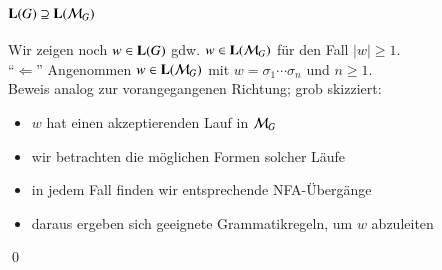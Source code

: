 \documentclass[aspectratio=1610,onlymath]{beamer}
\begin{document}
\begin{frame}[t]\frametitle{$\textbf{\textcolor{black}{L}}(G)\supseteq\textbf{\textcolor{black}{L}}(\mathcal{M}_G)$}

Wir zeigen noch $w\in\textbf{\textcolor{black}{L}}(G)$ gdw. $w\in\textbf{\textcolor{black}{L}}(\mathcal{M}_G)$ für den Fall $|w|\geq 1$.\\[1ex]

"`$\Leftarrow$"' Angenommen $w\in\textbf{\textcolor{black}{L}}(\mathcal{M}_G)$ mit $w=\sigma_1\cdots\sigma_n$ und $n\geq 1$.\pause\\[2ex]

Beweis analog zur vorangegangenen Richtung; grob skizziert:
\begin{itemize}
\item $w$ hat einen akzeptierenden Lauf in $\mathcal{M}_G$
\item wir betrachten die möglichen Formen solcher Läufe
\item in jedem Fall finden wir entsprechende NFA-Übergänge
\item daraus ergeben sich geeignete Grammatikregeln, um $w$ abzuleiten
\end{itemize}

\qed

\end{frame}
\end{document}
